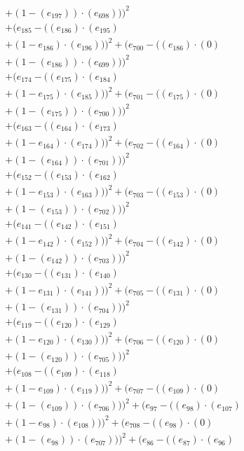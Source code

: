 \documentclass[10pt, a4paper]{article}
\begin{document}
\begin{small}
\begin{align*}
& + (1 - (e_{197})) \cdot (e_{698})))^{2} \\
& + (e_{185} - ((e_{186})  \cdot  (e_{195}) \\
& + (1 - e_{186})  \cdot  (e_{196})))^{2} + (e_{700} - ((e_{186}) \cdot (0) \\
& + (1 - (e_{186})) \cdot (e_{699})))^{2} \\
& + (e_{174} - ((e_{175})  \cdot  (e_{184}) \\
& + (1 - e_{175})  \cdot  (e_{185})))^{2} + (e_{701} - ((e_{175}) \cdot (0) \\
& + (1 - (e_{175})) \cdot (e_{700})))^{2} \\
& + (e_{163} - ((e_{164})  \cdot  (e_{173}) \\
& + (1 - e_{164})  \cdot  (e_{174})))^{2} + (e_{702} - ((e_{164}) \cdot (0) \\
& + (1 - (e_{164})) \cdot (e_{701})))^{2} \\
& + (e_{152} - ((e_{153})  \cdot  (e_{162}) \\
& + (1 - e_{153})  \cdot  (e_{163})))^{2} + (e_{703} - ((e_{153}) \cdot (0) \\
& + (1 - (e_{153})) \cdot (e_{702})))^{2} \\
& + (e_{141} - ((e_{142})  \cdot  (e_{151}) \\
& + (1 - e_{142})  \cdot  (e_{152})))^{2} + (e_{704} - ((e_{142}) \cdot (0) \\
& + (1 - (e_{142})) \cdot (e_{703})))^{2} \\
& + (e_{130} - ((e_{131})  \cdot  (e_{140}) \\
& + (1 - e_{131})  \cdot  (e_{141})))^{2} + (e_{705} - ((e_{131}) \cdot (0) \\
& + (1 - (e_{131})) \cdot (e_{704})))^{2} \\
& + (e_{119} - ((e_{120})  \cdot  (e_{129}) \\
& + (1 - e_{120})  \cdot  (e_{130})))^{2} + (e_{706} - ((e_{120}) \cdot (0) \\
& + (1 - (e_{120})) \cdot (e_{705})))^{2} \\
& + (e_{108} - ((e_{109})  \cdot  (e_{118}) \\
& + (1 - e_{109})  \cdot  (e_{119})))^{2} + (e_{707} - ((e_{109}) \cdot (0) \\
& + (1 - (e_{109})) \cdot (e_{706})))^{2} + (e_{97} - ((e_{98})  \cdot  (e_{107}) \\
& + (1 - e_{98})  \cdot  (e_{108})))^{2} + (e_{708} - ((e_{98}) \cdot (0) \\
& + (1 - (e_{98})) \cdot (e_{707})))^{2} + (e_{86} - ((e_{87})  \cdot  (e_{96}) \\

\end{align*}
\end{small}
\end{document}
